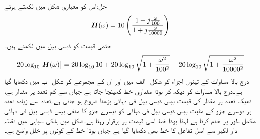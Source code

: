 حل:اس کو معیاری شکل  میں لکھتے ہوئے
\begin{align*}
{\ensuremath{{\boldsymbol{H}}}}(\omega)=10 \left(\frac{1+j\frac{\omega}{100}}{1+j\frac{\omega}{10000}}\right)
\end{align*}
حتمی قیمت کو ڈیسی بیل میں لکھتے ہیں۔
\begin{align*}
20\log_{10}\abs{{{\boldsymbol{H}}}(\omega)}=20\log_{10} 10+20\log_{10}\sqrt{1+\frac{\omega^2}{100^2}}-20\log_{10}\sqrt{1+\frac{\omega^2}{10000^2}}
\end{align*}
درج بالا مساوات کے تینوں اجزاء کو شکل -الف میں اور ان کے مجموعے کو شکل -ب میں دکھایا گیا ہے۔درج بالا مساوات کو دیکھ کر بوڈا مقداری خط کھینچا جاتا ہے جہاں  سے کم تعدد پر مقدار  ہے، ٹھیک  تعدد پر مقدار کی قیمت بیس ڈیسی بیل فی دہائی بڑھنا شروع ہو جاتی ہے۔تعدد  سے زیادہ تعدد پر دوسرے جزو کے مثبت بیس ڈیسی بیل فی دہائی کو تیسرے جزو کا منفی بیس ڈیسی بیل فی دہائی مکمل طور پر ختم کرتا ہے لہٰذا بوڈا خط اسی قیمت پر برقرار رہتا ہے۔شکل میں ہلکی سیاہی میں نقطہ دار لکیر سے اصل تفاعل کا خط بھی دکھایا گیا ہے جہاں بوڈا خط کے کونوں پر  خلل واضح ہے۔
